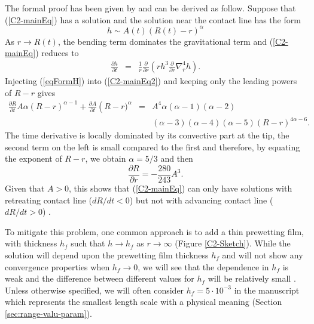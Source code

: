 The formal proof  has been given by \citet{Flitton:1999iv}  and can be
derived as follow.  Suppose that  (\ref{C2-mainEq}) has a solution and
the solution near the contact line has the form
\begin{equation}
  h \sim A(t)(R(t)-r)^{\alpha}
  \label{eqFormH}
\end{equation}
As $r \rightarrow R(t)$, the  bending term dominates the gravitational
term and (\ref{C2-mainEq}) reduces to
\begin{eqnarray}
  \frac{\partial       h}{\partial       t}&      =&\frac{1}{       r}
                                                     \frac{\partial}{\partial r}\left( rh^3 \frac{\partial}{\partial r}\nabla_r^4h\right).
                                                     \label{C2-mainEq2}
\end{eqnarray}
Injecting (\ref{eqFormH}) into (\ref{C2-mainEq2}) and keeping only the
leading powers of $R-r$ gives
\begin{eqnarray}
  \frac{\partial    R}{\partial    t}    A\alpha\left(R-r\right)^{\alpha-1}+
  \frac{\partial           A}{\partial           t}\left(R-r)^{\alpha}
  &=&A^4\alpha(\alpha-1)(\alpha-2)\nonumber\\
  &&(\alpha-3)(\alpha-4)(\alpha-5)(R-r)^{4\alpha-6}.\nonumber
\end{eqnarray}
The time derivative is locally dominated by its convective part at the
tip, the second  term on the left  is small compared to  the first and
therefore, by equating the exponent of $R-r$, we obtain $\alpha = 5/3$
and then
\begin{equation}
  \frac{\partial R}{\partial r} =-\frac{280}{243} A^3.
\end{equation}
Given  that $A>0$,  this shows  that (\ref{C2-mainEq})  can only  have
solutions  with  retreating  contact  line ($dR/dt<0$)  but  not  with
advancing             contact             line             ($dR/dt>0$)
\citep{Lister:2013ia,Flitton:1999iv}.

To  mitigate this  problem,  one  common approach  is  to  add a  thin
prewetting film, with thickness $h_f$  such that $h\rightarrow h_f$ as
$r\rightarrow  \infty$ (Figure  \ref{C2-Sketch}).  While  the solution
will depend upon the prewetting film thickness $h_f$ and will not show
any convergence properties  when $h_f\rightarrow 0$, we  will see that
the dependence in  $h_f$ is weak and the  difference between different
values      for      $h_f$      will     be      relatively      small
\citep{Lister:2013ia,Anonymous:QWXp_4JV}.  Unless otherwise specified,
we will often consider $h_f =  5\cdot 10^{-3}$ in the manuscript which
represents the smallest length scale  with a physical meaning (Section
\ref{sec:range-valu-param}).



